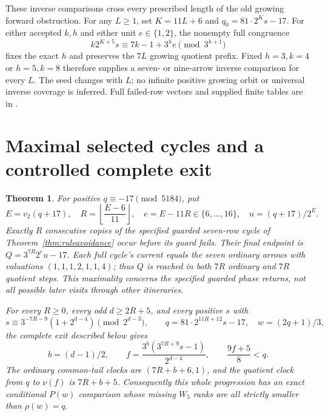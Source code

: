 \documentclass[11pt]{article}
\newtheorem{theorem}{Theorem}
\begin{document}
These inverse comparisons cross every prescribed length of the old
growing forward obstruction. For any $L\ge1$, set $K=11L+6$ and
$q_0=81\cdot2^Ks-17$. For either accepted $k,h$ and either unit
$e\in\{1,2\}$, the nonempty full congruence
\[
 k2^{K+5}s\equiv7k-1+3^he\pmod{3^{h+1}}
\]
fixes the exact $h$ and preserves the $7L$ growing quotient prefix.
Fixed $h=3,k=4$ or $h=5,k=8$ therefore supplies a seven- or nine-arrow
inverse comparison for every $L$. The seed changes with $L$; no infinite
positive growing orbit or universal inverse coverage is inferred.
Full failed-row vectors and supplied finite tables are in
.

\section{Maximal selected cycles and a controlled complete exit}
\begin{theorem}\label{thm:selectedexit}
For positive $q\equiv-17\pmod{5184}$, put
\[
 E=v_2(q+17),\quad R=\left\lfloor\frac{E-6}{11}\right\rfloor,
 \quad e=E-11R\in\{6,\ldots,16\},\quad u=(q+17)/2^E.
\]
Exactly $R$ consecutive copies of the specified guarded seven-row
cycle of Theorem~\ref{thm:ruleavoidance} occur before its guard fails.
Their final endpoint is $Q=3^{7R}2^eu-17$. Each full cycle's current
equals the seven ordinary arrows with valuations $(1,1,1,2,1,1,4)$;
thus $Q$ is reached in both $7R$ ordinary and $7R$ quotient steps.
This maximality concerns the specified guarded phase returns, not
all possible later visits through other itineraries.

For every $R\ge0$, every odd $d\ge2R+5$, and every positive $s$ with
\[
 s\equiv3^{-7R-9}(1+2^{d-4})\pmod{2^{d-3}},
 \qquad q=81\cdot2^{11R+12}s-17,\quad w=(2q+1)/3,
\]
the complete exit described below gives
\[
 b=(d-1)/2,\qquad
 f=\frac{3^b(3^{7R+9}s-1)}{2^{d-4}},\qquad
 \frac{9f+5}{8}<q.
\]
The ordinary common-tail clocks are $(7R+b+6,1)$, and the quotient
clock from $q$ to $\nu(f)$ is $7R+b+5$. Consequently this whole
progression has an exact conditional $P(w)$ comparison whose missing
$W_5$ ranks are all strictly smaller than $\rho(w)=q$.
\end{theorem}
\end{document}
